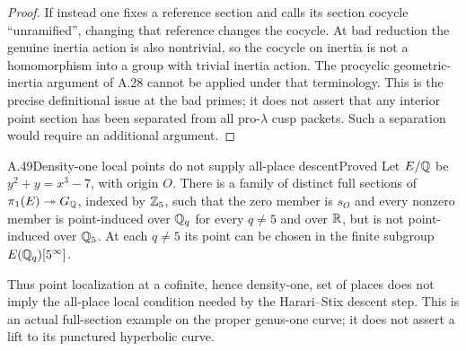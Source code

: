 \begin{proof}
If instead one fixes a reference section and calls its section cocycle
``unramified'', changing that reference changes the cocycle. At bad
reduction the genuine inertia action is also nontrivial, so the cocycle
on inertia is not a homomorphism into a group with trivial inertia
action. The procyclic geometric-inertia argument of A.28 cannot be
applied under that terminology. This is the precise definitional issue
at the bad primes; it does not assert that any interior point section
has been separated from all pro-$\lambda$ cusp packets. Such a
separation would require an additional argument.
\end{proof}

\begin{statement}{A.49}{Density-one local points do not supply all-place descent}{Proved}
Let $E/\mathbb Q$ be $y^2+y=x^3-7$, with origin $O$. There is a family of
distinct full sections of $\pi_1(E)\twoheadrightarrow G_\mathbb Q$, indexed
by $\mathbb Z_5$, such that the zero member is $s_O$ and every nonzero member
is point-induced over $\mathbb Q_q$ for every $q\ne5$ and over $\mathbb R$, but is
not point-induced over $\mathbb Q_5$. At each $q\ne5$ its point can be chosen
in the finite subgroup $E(\mathbb Q_q)[5^\infty]$.

Thus point localization at a cofinite, hence density-one, set of places
does not imply the all-place local condition needed by the
Harari--Stix descent step. This is an actual full-section example on
the proper genus-one curve; it does not assert a lift to its punctured
hyperbolic curve.
\end{statement}
